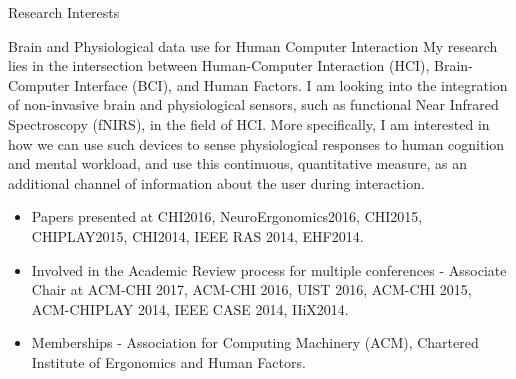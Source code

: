 \documentclass{resume} %
\begin{document}
\begin{rSection}{Research Interests}
\begin{rSubsection}{Brain and Physiological data use for Human Computer Interaction}{ }{ }{ }
\vspace{-5 mm}
My research lies in the intersection between Human-Computer Interaction (HCI), Brain-Computer Interface (BCI), and Human Factors. I am looking into the integration of non-invasive brain and physiological sensors, such as functional Near Infrared Spectroscopy (fNIRS), in the field of HCI. More specifically, I am interested in how we can use such devices to sense physiological responses to human cognition and mental workload, and use this continuous, quantitative measure, as an additional channel of information about the user during interaction.

\begin{itemize}
  \item Papers presented at CHI2016, NeuroErgonomics2016, CHI2015, CHIPLAY2015, CHI2014, IEEE RAS 2014, EHF2014.
  \item Involved in the Academic Review process for multiple conferences - Associate Chair at ACM-CHI 2017, ACM-CHI 2016, UIST 2016, ACM-CHI 2015, ACM-CHIPLAY 2014, IEEE CASE 2014, IIiX2014.
  \item  Memberships - Association for Computing Machinery (ACM), Chartered Institute of Ergonomics and Human Factors.
\end{itemize}

\end{rSubsection}

\end{rSection}
\end{document}
